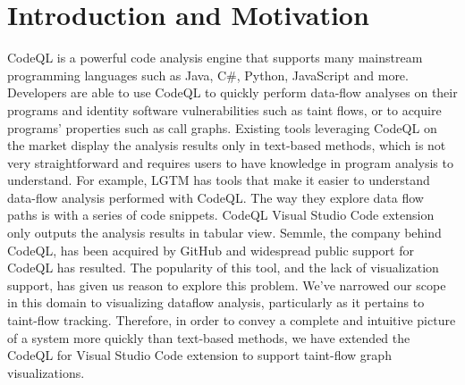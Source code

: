 \documentclass[sigplan,10pt,review]{acmart}
\begin{document}




\maketitle


\section{Introduction and Motivation}
CodeQL is a powerful code analysis engine that supports many mainstream programming languages such as Java, C\#, Python, JavaScript and more. Developers are able to use CodeQL to quickly perform data-flow analyses on their programs and identity software vulnerabilities such as taint flows, or to acquire programs' properties such as call graphs. 
\newline
\indent Existing tools leveraging CodeQL on the market display the analysis results only in text-based methods, which is not very straightforward and requires users to have knowledge in program analysis to understand. For example, LGTM has tools that make it easier to understand data-flow analysis performed with CodeQL. The way they explore data flow paths is with a series of code snippets. CodeQL Visual Studio Code extension only outputs the analysis results in tabular view.
\newline
\indent Semmle, the company behind CodeQL, has been acquired by GitHub and widespread public support for CodeQL has resulted. The popularity of this tool, and the lack of visualization support, has given us reason to explore this problem. We've narrowed our scope in this domain to visualizing dataflow analysis, particularly as it pertains to taint-flow tracking. 
\newline
\indent Therefore, in order to convey a complete and intuitive picture of a system more quickly than text-based methods, we have extended the CodeQL for Visual Studio Code extension to support taint-flow graph visualizations.
\end{document}
